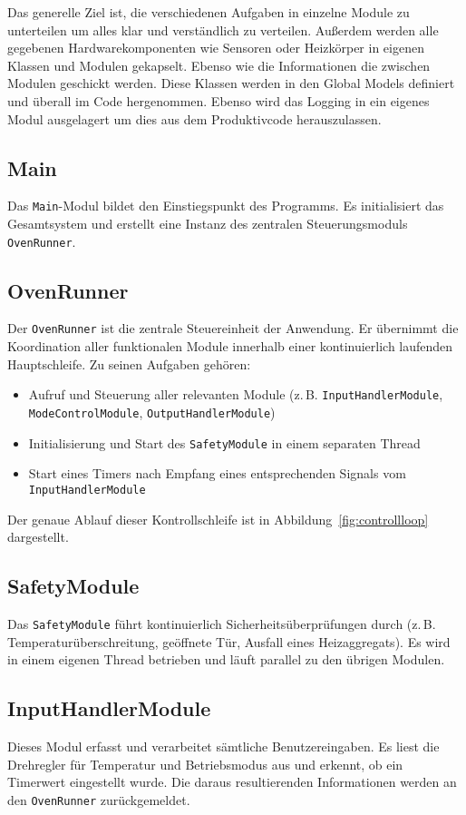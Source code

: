 \documentclass[a4paper,12pt]{article}
\begin{document}
Das generelle Ziel ist, die verschiedenen Aufgaben in einzelne Module zu unterteilen um alles klar und verständlich zu verteilen. Außerdem werden alle gegebenen Hardwarekomponenten wie Sensoren oder Heizkörper in eigenen Klassen und Modulen gekapselt. Ebenso wie die Informationen die zwischen Modulen geschickt werden. Diese Klassen werden in den Global Models definiert und überall im Code hergenommen. Ebenso wird das Logging in ein eigenes Modul ausgelagert um dies aus dem Produktivcode herauszulassen.

\subsection*{Main}
Das \texttt{Main}-Modul bildet den Einstiegspunkt des Programms. Es initialisiert das Gesamtsystem und erstellt eine Instanz des zentralen Steuerungsmoduls \texttt{OvenRunner}.

\subsection*{OvenRunner}
Der \texttt{OvenRunner} ist die zentrale Steuereinheit der Anwendung. Er übernimmt die Koordination aller funktionalen Module innerhalb einer kontinuierlich laufenden Hauptschleife. Zu seinen Aufgaben gehören:
\begin{itemize}
    \item Aufruf und Steuerung aller relevanten Module (z.\,B. \texttt{InputHandlerModule}, \texttt{ModeControlModule}, \texttt{OutputHandlerModule})
    \item Initialisierung und Start des \texttt{SafetyModule} in einem separaten Thread
    \item Start eines Timers nach Empfang eines entsprechenden Signals vom \texttt{InputHandlerModule}
\end{itemize}
Der genaue Ablauf dieser Kontrollschleife ist in Abbildung~\ref{fig:controllloop} dargestellt.

\subsection*{SafetyModule}
Das \texttt{SafetyModule} führt kontinuierlich Sicherheitsüberprüfungen durch (z.\,B. Temperaturüberschreitung, geöffnete Tür, Ausfall eines Heizaggregats). Es wird in einem eigenen Thread betrieben und läuft parallel zu den übrigen Modulen.

\subsection*{InputHandlerModule}
Dieses Modul erfasst und verarbeitet sämtliche Benutzereingaben. Es liest die Drehregler für Temperatur und Betriebsmodus aus und erkennt, ob ein Timerwert eingestellt wurde. Die daraus resultierenden Informationen werden an den \texttt{OvenRunner} zurückgemeldet.
\end{document}
